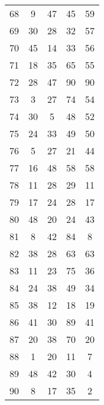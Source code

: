 \documentclass[a4paper,10pt,ngerman]{scrartcl}
\begin{document}
\begin{longtable}[c]{c|c|c|c|c}
    68 & 9 & 47 & 45 & 59 \\
    69 & 30 & 28 & 32 & 57 \\
    70 & 45 & 14 & 33 & 56 \\
    71 & 18 & 35 & 65 & 55 \\
    72 & 28 & 47 & 90 & 90 \\
    73 & 3 & 27 & 74 & 54 \\
    74 & 30 & 5 & 48 & 52 \\
    75 & 24 & 33 & 49 & 50 \\
    76 & 5 & 27 & 21 & 44 \\
    77 & 16 & 48 & 58 & 58 \\
    78 & 11 & 28 & 29 & 11 \\
    79 & 17 & 24 & 28 & 17 \\
    80 & 48 & 20 & 24 & 43 \\
    81 & 8 & 42 & 84 & 8 \\
    82 & 38 & 28 & 63 & 63 \\
    83 & 11 & 23 & 75 & 36 \\
    84 & 24 & 38 & 49 & 34 \\
    85 & 38 & 12 & 18 & 19 \\
    86 & 41 & 30 & 89 & 41 \\
    87 & 20 & 38 & 70 & 20 \\
    88 & 1 & 20 & 11 & 7 \\
    89 & 48 & 42 & 30 & 4 \\
    90 & 8 & 17 & 35 & 2
\end{longtable}
\end{document}
